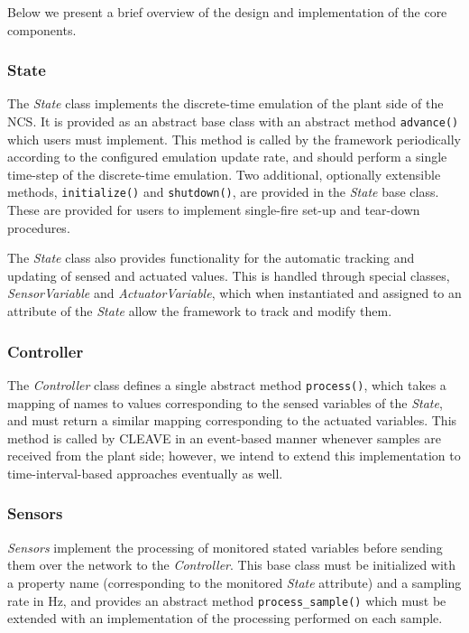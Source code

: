 Below we present a brief overview of the design and implementation of the core components.

\subsubsection{State}

The \emph{State} class implements the discrete-time emulation of the plant side of the \ac{NCS}.
It is provided as an abstract base class with an abstract method
\texttt{advance()} which users must implement.
This method is called by the framework periodically according to the configured emulation update rate, and should perform a single time-step of the discrete-time emulation.
Two additional, optionally extensible methods, \texttt{initialize()} and \texttt{shutdown()}, are provided in the \emph{State} base class.
These are provided for users to implement single-fire set-up and tear-down procedures.

The \emph{State} class also provides functionality for the automatic tracking and updating of sensed and actuated values.
This is handled through special classes, \emph{SensorVariable} and \emph{ActuatorVariable}, which when instantiated and assigned to an attribute of the \emph{State} allow the framework to track and modify them.

\subsubsection{Controller}

The \emph{Controller} class defines a single abstract method \texttt{process()}, which takes a mapping of names to values corresponding to the sensed variables of the \emph{State}, and must return a similar mapping corresponding to the actuated variables.
This method is called by \ac{CLEAVE} in an event-based manner whenever samples are received from the plant side; however, we intend to extend this implementation to time-interval-based approaches eventually as well.

\subsubsection{Sensors}

\emph{Sensors} implement the processing of monitored stated variables before sending them over the network to the \emph{Controller}.
This base class must be initialized with a property name (corresponding to the monitored \emph{State} attribute) and a sampling rate in \si{\hertz}, and provides an abstract method \texttt{process_sample()} which must be extended with an implementation of the processing performed on each sample.

